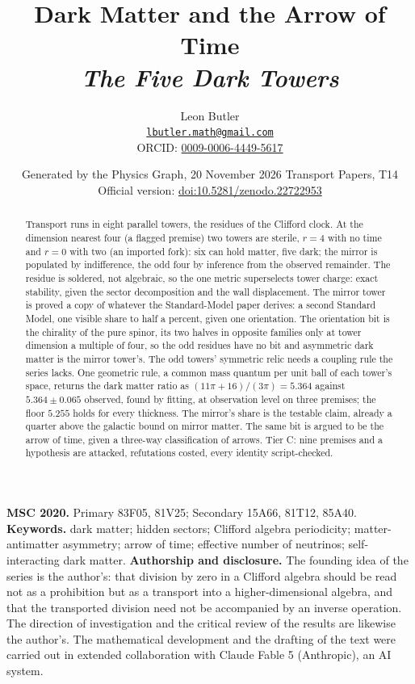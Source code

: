\documentclass[11pt]{article}
\title{\bfseries Dark Matter and the Arrow of Time\\[4pt]\large\itshape The Five Dark Towers}
\author{Leon Butler\\ \normalsize\href{mailto:lbutler.math@gmail.com}{\texttt{lbutler.math@gmail.com}}\\ \normalsize ORCID: \href{https://orcid.org/0009-0006-4449-5617}{0009-0006-4449-5617}}
\date{Generated by the Physics Graph, 20 November 2026 \textperiodcentered{} Transport Papers, T14\\[3pt]\small Official version: \href{https://doi.org/10.5281/zenodo.22722953}{doi:10.5281/zenodo.22722953}}
\theoremstyle{definition}
\theoremstyle{plain}
\begin{document}
\maketitle
\begin{abstract}
\normalsize
Transport runs in eight parallel towers, the residues of the Clifford clock. At the dimension nearest four (a flagged premise) two towers are sterile, $r = 4$ with no time and $r = 0$ with two (an imported fork): six can hold matter, five dark; the mirror is populated by indifference, the odd four by inference from the observed remainder. The residue is soldered, not algebraic, so the one metric superselects tower charge: exact stability, given the sector decomposition and the wall displacement. The mirror tower is proved a copy of whatever the Standard-Model paper derives: a second Standard Model, one visible share to half a percent, given one orientation. The orientation bit is the chirality of the pure spinor, its two halves in opposite families only at tower dimension a multiple of four, so the odd residues have no bit and asymmetric dark matter is the mirror tower's. The odd towers' symmetric relic needs a coupling rule the series lacks. One geometric rule, a common mass quantum per unit ball of each tower's space, returns the dark matter ratio as $(11\pi + 16)/(3\pi) = 5.364$ against $5.364 \pm 0.065$ observed, found by fitting, at observation level on three premises; the floor $5.255$ holds for every thickness. The mirror's share is the testable claim, already a quarter above the galactic bound on mirror matter. The same bit is argued to be the arrow of time, given a three-way classification of arrows. Tier C: nine premises and a hypothesis are attacked, refutations costed, every identity script-checked.
\end{abstract}
\medskip
\noindent\textbf{MSC 2020.} Primary 83F05, 81V25; Secondary 15A66, 81T12, 85A40.\\
\textbf{Keywords.} dark matter; hidden sectors; Clifford algebra periodicity; matter-antimatter asymmetry; arrow of time; effective number of neutrinos; self-interacting dark matter.
\newpage
\noindent \textbf{Authorship and disclosure. }The founding idea of the series is the author's: that division by zero in a Clifford algebra should be read not as a prohibition but as a transport into a higher-dimensional algebra, and that the transported division need not be accompanied by an inverse operation. The direction of investigation and the critical review of the results are likewise the author's. The mathematical development and the drafting of the text were carried out in extended collaboration with Claude Fable 5 (Anthropic), an AI system.
\end{document}
